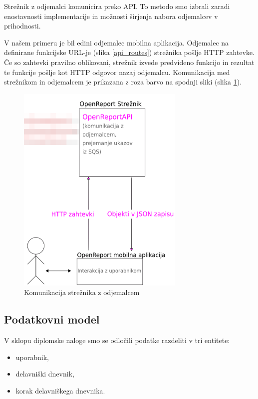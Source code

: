 \documentclass[a4paper, 12pt]{book}
\begin{document}
Strežnik z odjemalci komunicira preko API.
To metodo smo izbrali zaradi enostavnosti implementacije in možnosti širjenja nabora odjemalcev v prihodnosti.

V našem primeru je bil edini odjemalec mobilna aplikacija.
Odjemalec na definirane funkcijske URL-je (slika \ref{api_routes}) strežnika pošlje HTTP zahtevke.
Če so zahtevki pravilno oblikovani, strežnik izvede predvideno funkcijo in rezultat te funkcije pošlje kot HTTP odgovor nazaj odjemalcu.
Komunikacija med strežnikom in odjemalcem je prikazana z roza barvo na spodnji sliki (slika \ref{plan_server_client}).

\begin{figure}[H]
\begin{center}
\includegraphics[width=8cm]{plan_server_client}
\end{center}
\caption{Komunikacija strežnika z odjemalcem}
\label{plan_server_client}
\end{figure}


\subsection{Podatkovni model}

V sklopu diplomske naloge smo se odločili podatke razdeliti v tri entitete:
\begin{itemize}
	\item uporabnik,
	\item delavniški dnevnik,
	\item korak delavniškega dnevnika.
\end{itemize}
\end{document}
